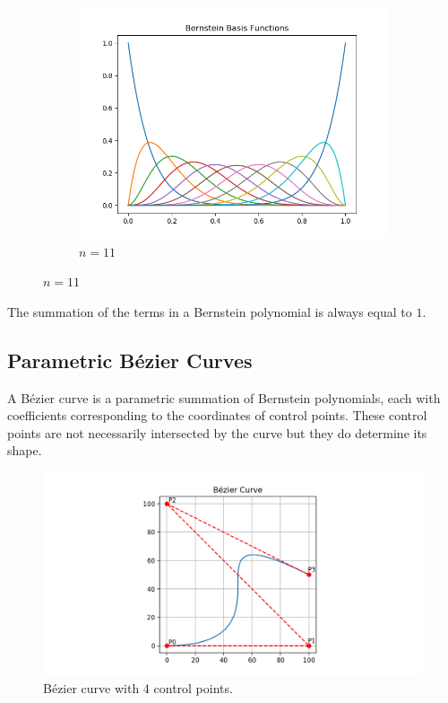 \documentclass[12pt,letterpaper]{article}
\begin{document}
\begin{figure}[H]
\begin{center}
\begin{subfigure}[b]{.3\linewidth}
            \includegraphics[width=\linewidth]{bern11}
            \caption{$n=11$}
        \end{subfigure}
    \end{center}
\end{figure}

The summation of the terms in a Bernstein polynomial is always equal to $1$. 

\subsection{Parametric B\'ezier Curves}
A B\'ezier curve is a parametric summation of Bernstein polynomials, each with coefficients corresponding to the coordinates of control points. These control points are not necessarily intersected by the curve but they do determine its shape.

\begin{figure}[H]
    \includegraphics[width=15cm]{Figure_1}
    \centering
    \caption{B\'ezier curve with 4 control points.}
    \label{fig:demo}
\end{figure}
\end{document}
